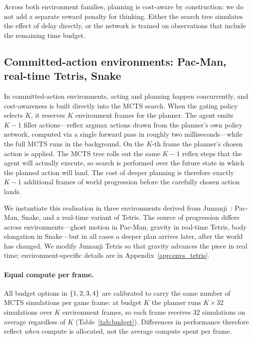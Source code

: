 Across both environment families, planning is cost-aware by
construction: we do not add a separate reward penalty for thinking.
Either the search tree simulates the effect of delay directly, or the
network is trained on observations that include the remaining time
budget.

\subsection{Committed-action environments: Pac-Man, real-time Tetris, Snake}

In committed-action environments, acting and planning happen
concurrently, and cost-awareness is built directly into the MCTS
search.
When the gating policy selects $K$, it reserves $K$ environment frames
for the planner.
The agent emits $K{-}1$ filler actions---reflex argmax actions drawn
from the planner's own policy network, computed via a single forward
pass in roughly two milliseconds---while the full MCTS runs in the
background.
On the $K$-th frame the planner's chosen action is applied.
The MCTS tree rolls out the same $K{-}1$ reflex steps that the agent
will actually execute, so search is performed over the future state in
which the planned action will land.
The cost of deeper planning is therefore exactly $K{-}1$ additional
frames of world progression before the carefully chosen action lands.

We instantiate this realisation in three environments derived from
Jumanji~\citep{bonnet2024jumanji}: Pac-Man, Snake, and a real-time
variant of Tetris.
The source of progression differs across environments---ghost motion in
Pac-Man, gravity in real-time Tetris, body elongation in Snake---but in
all cases a deeper plan arrives later, after the world has changed.
We modify Jumanji Tetris so that gravity advances the piece in real
time; environment-specific details are in Appendix~\ref{app:envs_tetris}.

\paragraph{Equal compute per frame.}
All budget options in $\{1,2,3,4\}$ are calibrated to carry the same number
of MCTS simulations per game frame: at budget $K$ the planner runs
$K \times 32$ simulations over $K$ environment frames, so each frame
receives 32 simulations on average regardless of $K$
(Table~\ref{tab:budget}).
Differences in performance therefore reflect \emph{when} compute is
allocated, not the average compute spent per frame.

